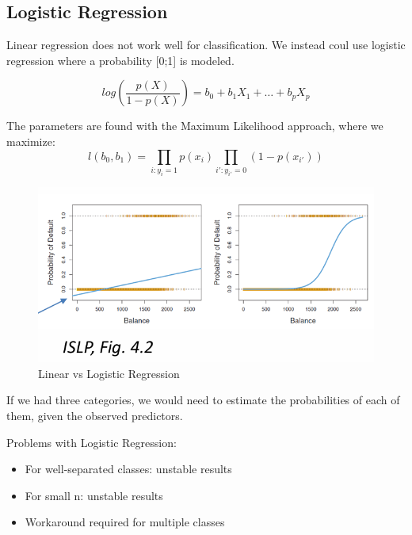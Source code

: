 \documentclass[../Main.tex]{subfiles}
\begin{document}
\newpage
\subsection{Logistic Regression}
Linear regression does not work well for classification.
We instead coul use logistic regression where a probability [0;1] is modeled.

 \begin{equation}
    log(\frac{p(X)}{1-p(X)}) = b_0 + b_1 X_1 + \dots + b_p X_p
 \end{equation}


 The parameters are found with the Maximum Likelihood approach, where we maximize:
 \begin{equation}
    l(b_0,b_1) = \prod_{i:y_i=1} p(x_i) \prod_{i':y_{i'}=0} (1-p(x_{i'}))
 \end{equation}

 \begin{figure}[H]
    \centering
    \includegraphics[width=0.75\linewidth]{Images/lin-reg-vs-log.png}
    \caption{Linear vs Logistic Regression}
\end{figure}

If we had three categories, we would 
need to estimate the probabilities of 
each of them, given the observed 
predictors.

Problems with Logistic Regression:
\begin{itemize}
    \item For well-separated classes: unstable results
    \item For small n: unstable results
    \item Workaround required for multiple classes
\end{itemize}
\end{document}
